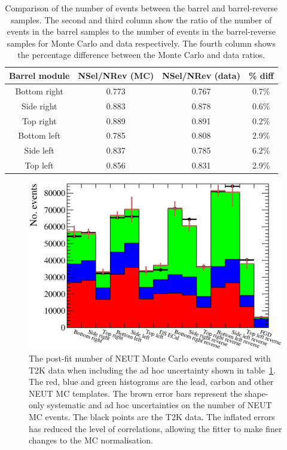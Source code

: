 \begin{table}[t!]
  \begin{tabular}{c c c c }
    Barrel module & NSel/NRev (MC) & NSel/NRev (data) & \% diff \\ \hline \hline
    Bottom right & 0.773 & 0.767 & 0.7\% \\
    Side right & 0.883 & 0.878 & 0.6\% \\
    Top right & 0.889 & 0.891 & 0.2\% \\
    Bottom left & 0.785 & 0.808 & 2.9\% \\
    Side left & 0.837 & 0.785 & 6.2\% \\
    Top left & 0.856 & 0.831 & 2.9\% \\
  \end{tabular}
  \caption{Comparison of the number of events between the barrel and barrel-reverse samples.  The second and third column show the ratio of the number of events in the barrel samples to the number of events in the barrel-reverse samples for Monte Carlo and data respectively.  The fourth column shows the percentage difference between the Monte Carlo and data ratios.}
  \label{table:NSelToNRevRatio}
\end{table}
\begin{figure}
  \centering
  \includegraphics[width=15cm]{images/measurement/data/MCTemplatesWithSystematics_T2KData_PostFit_WithErrorFudge.eps}
  \caption{The post-fit number of NEUT Monte Carlo events compared with T2K data when including the ad hoc uncertainty shown in table~\ref{table:NSelToNRevRatio}.  The red, blue and green histograms are the lead, carbon and other NEUT MC templates.  The brown error bars represent the shape-only systematic and ad hoc uncertainties on the number of NEUT MC events.  The black points are the T2K data.  The inflated errors has reduced the level of correlations, allowing the fitter to make finer changes to the MC normalisation.}
  \label{fig:MCTemplatesWithSystematicsT2KDataPostFitWithFudge}
\end{figure}
